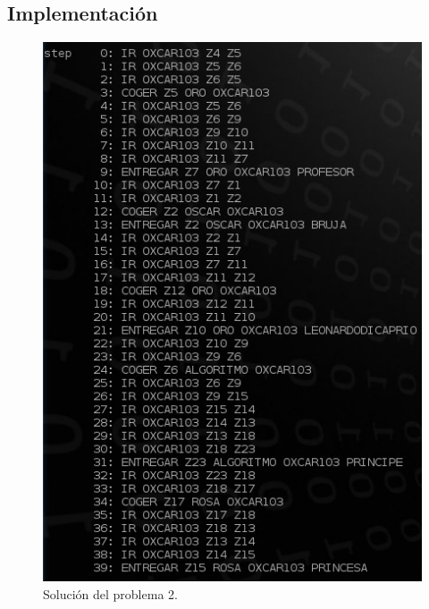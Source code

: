 \documentclass[a4paper, 11pt]{article}
\begin{document}
	\subsection{Implementación}
		\begin{figure}[H]
			\centering
			\includegraphics[width=15cm]{Problema2.jpg}
			\caption{Solución del problema 2.}
			\label{Prob-2}
		\end{figure}
\end{document}
